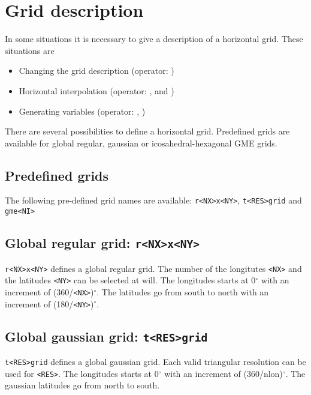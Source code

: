 \section{Grid description}

In some situations it is necessary to give a description of a horizontal grid.
These situations are

\begin{itemize}
\item Changing the grid description (operator: )
\item Horizontal interpolation (operator: ,  and )
\item Generating variables (operator: , )
\end{itemize}

There are several possibilities to define a horizontal grid.
Predefined grids are available for global regular, gaussian or icosahedral-hexagonal GME grids.


\subsection{Predefined grids}

The following pre-defined grid names are available: 
{\tt r<NX>x<NY>}, {\tt t<RES>grid} and {\tt gme<NI>}

\subsection*{Global regular grid: {\tt r<NX>x<NY>}}
    {\tt r<NX>x<NY>} defines a global regular grid.
    The number of the longitutes {\tt <NX>} and the latitudes {\tt <NY>}
    can be selected at will.
    The longitudes starts at 0$^\circ$ with an increment of (360/{\tt <NX>})$^\circ$.
    The latitudes go from south to north with an increment of (180/{\tt <NY>})$^\circ$.

\subsection*{Global gaussian grid: {\tt t<RES>grid}}
    {\tt t<RES>grid} defines a global gaussian grid.
    Each valid triangular resolution can be used for {\tt <RES>}.
    The longitudes starts at 0$^\circ$ with an increment of (360/nlon)$^\circ$.
    The gaussian latitudes go from north to south.

